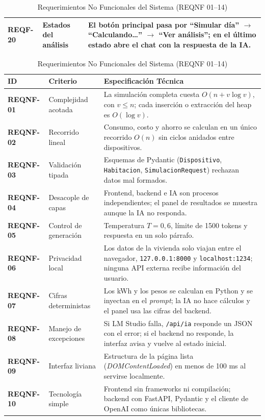 \documentclass[10pt,journal,compsoc]{IEEEtran}
\begin{document}
\begin{table}[p]
\begin{tabularx}{\textwidth}{@{}l l X@{}}
\textbf{REQF-20} & Estados del análisis & El botón principal pasa por ``Simular día'' $\rightarrow$ ``Calculando…'' $\rightarrow$ ``Ver análisis''; en el último estado abre el chat con la respuesta de la IA. \\
\bottomrule
\end{tabularx}
\vspace{0.9em}
\caption{Requerimientos No Funcionales del Sistema (REQNF 01--14)}
\label{tab:reqnf}
\begin{tabularx}{\textwidth}{@{}l l X@{}}
\toprule
\textbf{ID} & \textbf{Criterio} & \textbf{Especificación Técnica} \\
\midrule
\textbf{REQNF-01} & Complejidad acotada & La simulación completa cuesta $O(n + v\log v)$, con $v \le n$; cada inserción o extracción del heap es $O(\log v)$. \\
\textbf{REQNF-02} & Recorrido lineal & Consumo, costo y ahorro se calculan en un único recorrido $O(n)$ sin ciclos anidados entre dispositivos. \\
\textbf{REQNF-03} & Validación tipada & Esquemas de Pydantic (\texttt{Dispositivo}, \texttt{Habitacion}, \texttt{SimulacionRequest}) rechazan datos mal formados. \\
\textbf{REQNF-04} & Desacople de capas & Frontend, backend e IA son procesos independientes; el panel de resultados se muestra aunque la IA no responda. \\
\textbf{REQNF-05} & Control de generación & Temperatura $T = 0{,}6$, límite de 1500 tokens y respuesta en un solo párrafo. \\
\textbf{REQNF-06} & Privacidad local & Los datos de la vivienda solo viajan entre el navegador, \texttt{127.0.0.1:8000} y \texttt{localhost:1234}; ninguna API externa recibe información del usuario. \\
\textbf{REQNF-07} & Cifras deterministas & Los kWh y los pesos se calculan en Python y se inyectan en el \emph{prompt}; la IA no hace cálculos y el panel usa las cifras del backend. \\
\textbf{REQNF-08} & Manejo de excepciones & Si LM Studio falla, \texttt{/api/ia} responde un JSON con el error; si el backend no responde, la interfaz avisa y vuelve al estado inicial. \\
\textbf{REQNF-09} & Interfaz liviana & Estructura de la página lista (\emph{DOMContentLoaded}) en menos de 100 ms al servirse localmente. \\
\textbf{REQNF-10} & Tecnología simple & Frontend sin frameworks ni compilación; backend con FastAPI, Pydantic y el cliente de OpenAI como únicas bibliotecas. \\

\end{tabularx}
\end{table}
\end{document}
